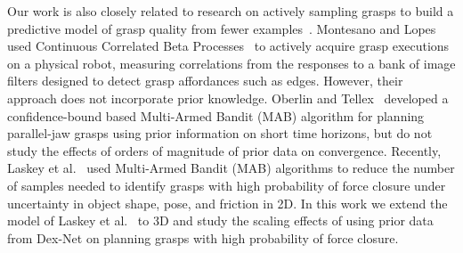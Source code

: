 Our work is also closely related to research on actively sampling grasps to build a predictive model of grasp quality from fewer examples~\cite{detry2011learning, kehoe2012estimating, kroemer2010combining, salganicoff1996active}.
Montesano and Lopes~\cite{montesano2012active} used Continuous Correlated Beta Processes~\cite{goetschalckx2011continuous} to actively acquire grasp executions on a physical robot, measuring correlations from the responses to a bank of image filters designed to detect grasp affordances such as edges.
However, their approach does not incorporate prior knowledge.
Oberlin and Tellex~\cite{oberlin2015autonomously} developed a confidence-bound based Multi-Armed Bandit (MAB) algorithm for planning parallel-jaw grasps using prior information on short time horizons, but do not study the effects of orders of magnitude of prior data on convergence.
Recently, Laskey et al.~\cite{laskey2015bandits} used Multi-Armed Bandit (MAB) algorithms to reduce the number of samples needed to identify grasps with high probability of force closure under uncertainty in object shape, pose, and friction in 2D.
In this work we extend the model of Laskey et al.~\cite{laskey2015bandits} to 3D and study the scaling effects of using prior data from Dex-Net on planning grasps with high probability of force closure.

